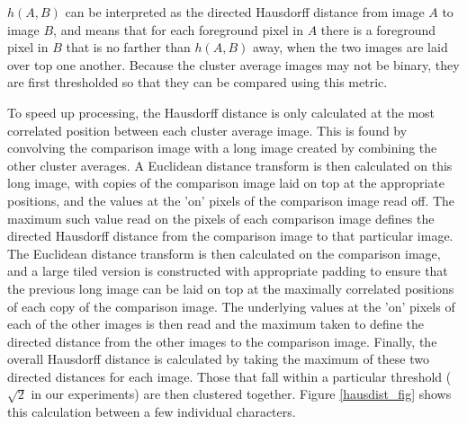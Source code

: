 \documentclass[times, 10pt,twocolumn]{article}
\begin{document}
$h(A,B)$ can be interpreted as the directed Hausdorff distance from image $A$ to
image $B$, and means that for each foreground pixel in $A$ there is a foreground
pixel in $B$ that is no farther than $h(A,B)$ away, when the two images are 
laid over top one another.  Because the cluster average images may not be
binary, they are first thresholded so that they can be compared using this
metric.

To speed up processing, the Hausdorff distance is only calculated at the most
correlated position between each cluster average image.  This is found by
convolving the comparison image with a long image created by combining the
other cluster averages.  A Euclidean distance transform is then calculated on
this long image, with copies of the comparison image laid on top at the
appropriate positions, and the values at the 'on' pixels of the comparison 
image read off.  The maximum such value read on the pixels of each
comparison image defines the directed Hausdorff distance from the comparison 
image to that particular image.  The Euclidean distance transform is then
calculated on the comparison image, and a large tiled version is constructed
with appropriate padding to ensure that the previous long image can be laid on
top at the maximally correlated positions of each copy of the comparison image.
The underlying values at the 'on' pixels of each of the other images is then
read and the maximum taken to define the directed distance from the other
images to the comparison image.  Finally, the overall Hausdorff distance is
calculated by taking the maximum of these two directed distances for each
image.  Those that fall within a particular threshold ($\sqrt 2$ in our
experiments) are then clustered together.  Figure \ref{hausdist_fig}
shows this calculation between a few individual characters.
\end{document}
